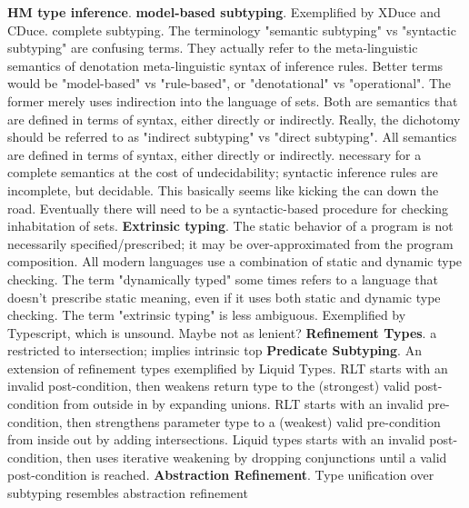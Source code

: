\documentclass[letterpaper]{llncs}
\begin{document}
\textbf{HM type inference}.  \newline
\textbf{model-based subtyping}. Exemplified by XDuce and CDuce. complete subtyping.
The terminology "semantic subtyping" vs "syntactic subtyping" are confusing terms. 
They actually refer to the meta-linguistic semantics of denotation 
meta-linguistic syntax of inference rules.
Better terms would be "model-based" vs "rule-based", or "denotational" vs "operational".
The former merely uses indirection into the language of sets.
Both are semantics that are defined in terms of syntax, either directly or indirectly.
Really, the dichotomy should be referred to as "indirect subtyping" vs "direct subtyping".
All semantics are defined in terms of syntax, either directly or indirectly. 
necessary for a complete semantics at the cost of undecidability; syntactic inference rules are incomplete, but decidable.
This basically seems like kicking the can down the road. Eventually there will need to be 
a syntactic-based procedure for checking inhabitation of sets.
\newline
\textbf{Extrinsic typing}. The static behavior of a program is not necessarily specified/prescribed; 
it may be over-approximated from the program composition. 
All modern languages use a combination of static and dynamic type checking.
The term "dynamically typed" some times refers to a language that doesn't prescribe static meaning,
even if it uses both static and dynamic type checking. The term "extrinsic typing" is less ambiguous.
Exemplified by Typescript, which is unsound. Maybe not as lenient?  
\newline
\textbf{Refinement Types}. a restricted to intersection; implies intrinsic top\newline
\textbf{Predicate Subtyping}. An extension of refinement types exemplified by Liquid Types.
RLT starts with an invalid post-condition, then weakens return type to the (strongest) valid post-condition from outside in by expanding unions. 
RLT starts with an invalid pre-condition, then strengthens parameter type to a (weakest) valid pre-condition from inside out by adding intersections. 
Liquid types starts with an invalid post-condition, then uses iterative weakening by dropping conjunctions until a valid post-condition is reached.
\newline
\textbf{Abstraction Refinement}. Type unification over subtyping resembles abstraction refinement  
\end{document}
